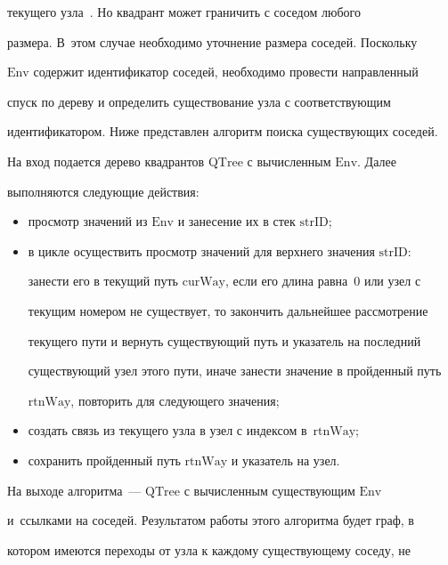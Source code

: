 текущего узла~\cite{14-sor}. Но квадрант может граничить с соседом любого 

размера. В~этом случае необходимо уточнение размера соседей. Поскольку 

$\mathrm{Env}$ содержит идентификатор соседей, необходимо провести направленный 

спуск по дереву и определить существование узла с соответствующим 

идентификатором. Ниже представлен алгоритм поиска существующих соседей.

  

  На вход подается дерево квадрантов $\mathrm{QTree}$ с вычисленным $\mathrm{Env}$. Далее 

выполняются следующие действия:

  \begin{itemize}

\item просмотр значений из $\mathrm{Env}$ и занесение их в стек $\mathrm{strID}$;

\item в цикле осуществить просмотр значений для верхнего значения $\mathrm{strID}$: 

занести его в текущий путь $\mathrm{curWay}$, если его длина равна~0 или узел с 

текущим номером не существует, то закончить дальнейшее рассмотрение 

текущего пути и вернуть существующий путь и указатель на последний 

существующий узел этого пути, иначе занести значение в пройденный путь 

$\mathrm{rtnWay}$, повторить для следующего значения;

\item создать связь из текущего узла в узел с индексом в~$\mathrm{rtnWay}$;

\item сохранить пройденный путь $\mathrm{rtnWay}$ и указатель на узел.

  \end{itemize}

  

  На выходе алгоритма~--- $\mathrm{QTree}$ с вычисленным существующим $\mathrm{Env}$ 

  и~ссылками на соседей. Результатом работы этого алгоритма будет граф, в 

котором имеются переходы от узла к каждому существующему соседу, не 


